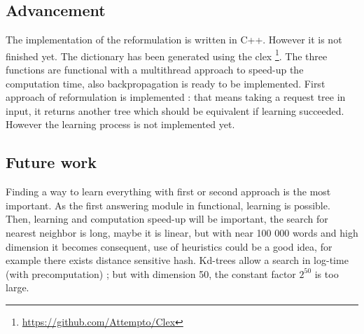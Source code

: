 \subsection{Advancement}

The implementation of the reformulation is written in C++. However it is not finished yet. The dictionary has been generated using the clex \footnote{\url{https://github.com/Attempto/Clex}}. The three functions are functional with a multithread approach to speed-up the computation time, also backpropagation is ready to be implemented.
First approach of reformulation is implemented : that means taking a request tree in input, it returns another tree which should be equivalent if learning succeeded. However the learning process is not implemented yet.

\subsection{Future work}

Finding a way to learn everything with first or second approach is the most important. As the first answering module in functional, learning is possible. Then, learning and computation speed-up will be important, the search for nearest neighbor is long, maybe it is linear, but with near 100 000 words and high dimension it becomes consequent, use of heuristics could be a good idea, for example there exists distance sensitive hash. Kd-trees allow a search in log-time (with precomputation) ; but with dimension 50, the constant factor $2^{50}$ is too large. 

